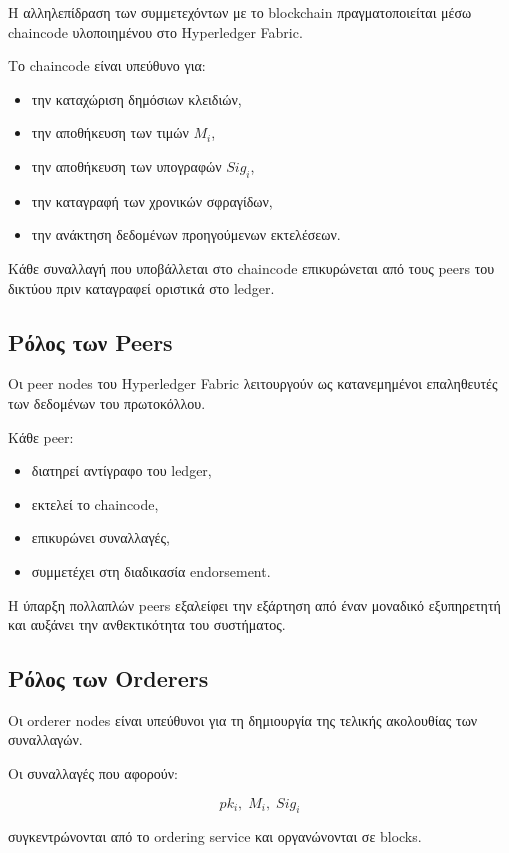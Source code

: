\documentclass[12pt,a4paper]{report}
\begin{document}
Η αλληλεπίδραση των συμμετεχόντων με το blockchain πραγματοποιείται μέσω chaincode υλοποιημένου στο Hyperledger Fabric.

Το chaincode είναι υπεύθυνο για:

\begin{itemize}
\item την καταχώριση δημόσιων κλειδιών,
\item την αποθήκευση των τιμών $M_i$,
\item την αποθήκευση των υπογραφών $Sig_i$,
\item την καταγραφή των χρονικών σφραγίδων,
\item την ανάκτηση δεδομένων προηγούμενων εκτελέσεων.
\end{itemize}

Κάθε συναλλαγή που υποβάλλεται στο chaincode επικυρώνεται από τους peers του δικτύου πριν καταγραφεί οριστικά στο ledger.

\subsection{Ρόλος των Peers}

Οι peer nodes του Hyperledger Fabric λειτουργούν ως κατανεμημένοι επαληθευτές των δεδομένων του πρωτοκόλλου.

Κάθε peer:

\begin{itemize}
\item διατηρεί αντίγραφο του ledger,
\item εκτελεί το chaincode,
\item επικυρώνει συναλλαγές,
\item συμμετέχει στη διαδικασία endorsement.
\end{itemize}

Η ύπαρξη πολλαπλών peers εξαλείφει την εξάρτηση από έναν μοναδικό εξυπηρετητή και αυξάνει την ανθεκτικότητα του συστήματος.

\subsection{Ρόλος των Orderers}

Οι orderer nodes είναι υπεύθυνοι για τη δημιουργία της τελικής ακολουθίας των συναλλαγών.

Οι συναλλαγές που αφορούν:

\[
pk_i,\;
M_i,\;
Sig_i
\]

συγκεντρώνονται από το ordering service και οργανώνονται σε blocks.
\end{document}
